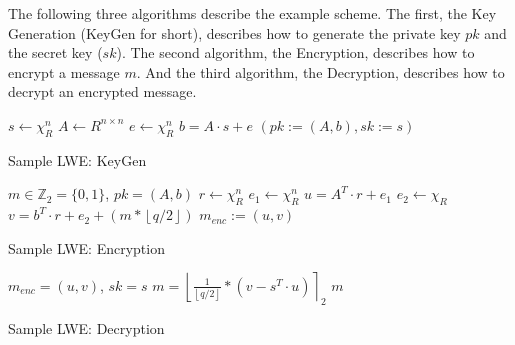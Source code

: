 The following three algorithms describe the example scheme. The first, the Key Generation (KeyGen for short), describes how to generate the private key $pk$ and the secret key ($sk$). The second algorithm, the Encryption, describes how to encrypt a message $m$. And the third algorithm, the Decryption, describes how to decrypt an encrypted message.

\begin{algorithm}[htb]
    \begin{algorithmic}[1]
        \STATE $s \leftarrow \chi_R^n$
        \STATE $A \leftarrow R^{n \times n}$
        \STATE $e \leftarrow \chi_R^n$
        \STATE $b = A\cdot s+e$
        \RETURN $(pk:=(A, b), sk:=s )$
    \end{algorithmic}
    \caption{Sample LWE: KeyGen}
    \label{alg: SampleLweKeyGen}
\end{algorithm}

\begin{algorithm}[htb]
    \begin{algorithmic}[1]
        \REQUIRE $m \in \mathbb{Z}_2 = \{0, 1\}$, $pk = (A, b)$
        \STATE $r \leftarrow \chi_R^n$
        \STATE $e_1 \leftarrow \chi_R^n$
        \STATE $u = A^T \cdot r + e_1$
        \STATE $e_2 \leftarrow \chi_R$
        \STATE $v = b^T \cdot r + e_2 + (m*\left\lfloor q/2\right\rfloor)$
        \RETURN $m_{enc} := (u, v)$
    \end{algorithmic}
    \caption{Sample LWE: Encryption}
    \label{alg: SampleLweEncryption}
\end{algorithm}

\begin{algorithm}[htb]
    \begin{algorithmic}[1]
        \REQUIRE $m_{enc} = (u, v)$, $sk = s$
        \STATE $m = \left\lfloor \frac{1}{\left\lfloor q/2\right\rfloor}*(v-s^T \cdot u)\right\rceil _2 $
        \RETURN $m$
    \end{algorithmic}
    \caption{Sample LWE: Decryption}
    \label{alg: SampleLweDecryption}
\end{algorithm}

